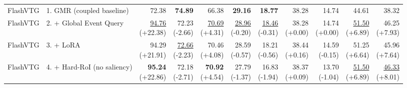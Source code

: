 \documentclass{article}
\begin{document}
{\begin{tabular}{llrrrrrrrrr}
\midrule
FlashVTG & 1. GMR (coupled baseline) & 72.38 & \textbf{74.89} & 66.38 & \textbf{29.16} & \textbf{18.77} & 38.28 & 14.74 & 44.61 & 38.32 \\
FlashVTG & 2. + Global Event Query & \shortstack{\underline{94.76} \\ {\scriptsize (+22.38)}} & \shortstack{72.23 \\ {\scriptsize (-2.66)}} & \shortstack{\underline{70.69} \\ {\scriptsize (+4.31)}} & \shortstack{\underline{28.96} \\ {\scriptsize (-0.20)}} & \shortstack{\underline{18.46} \\ {\scriptsize (-0.31)}} & \shortstack{38.28 \\ {\scriptsize (+0.00)}} & \shortstack{14.74 \\ {\scriptsize (+0.00)}} & \shortstack{\underline{51.50} \\ {\scriptsize (+6.89)}} & \shortstack{46.25 \\ {\scriptsize (+7.93)}} \\
FlashVTG & 3. + LoRA & \shortstack{94.29 \\ {\scriptsize (+21.91)}} & \shortstack{\underline{72.66} \\ {\scriptsize (-2.23)}} & \shortstack{70.46 \\ {\scriptsize (+4.08)}} & \shortstack{28.59 \\ {\scriptsize (-0.57)}} & \shortstack{18.21 \\ {\scriptsize (-0.56)}} & \shortstack{38.44 \\ {\scriptsize (+0.16)}} & \shortstack{14.59 \\ {\scriptsize (-0.15)}} & \shortstack{51.25 \\ {\scriptsize (+6.64)}} & \shortstack{45.96 \\ {\scriptsize (+7.64)}} \\
FlashVTG & 4. + Hard-RoI (no saliency) & \shortstack{\textbf{95.24} \\ {\scriptsize (+22.86)}} & \shortstack{72.18 \\ {\scriptsize (-2.71)}} & \shortstack{\textbf{70.92} \\ {\scriptsize (+4.54)}} & \shortstack{27.79 \\ {\scriptsize (-1.37)}} & \shortstack{16.83 \\ {\scriptsize (-1.94)}} & \shortstack{38.37 \\ {\scriptsize (+0.09)}} & \shortstack{13.70 \\ {\scriptsize (-1.04)}} & \shortstack{\underline{51.50} \\ {\scriptsize (+6.89)}} & \shortstack{\underline{46.33} \\ {\scriptsize (+8.01)}} \\

\end{tabular}}
\end{document}
